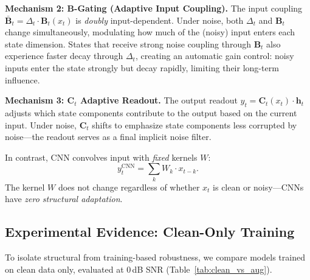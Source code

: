 \documentclass[journal]{IEEEtran}
\begin{document}
\smallskip\noindent\textbf{Mechanism 2: $\mathbf{B}$-Gating (Adaptive Input Coupling).}
The input coupling $\bar{\mathbf{B}}_t = \Delta_t \cdot \mathbf{B}_t(x_t)$ is \emph{doubly} input-dependent.
Under noise, both $\Delta_t$ and $\mathbf{B}_t$ change simultaneously, modulating how much of the (noisy) input enters each state dimension.
States that receive strong noise coupling through $\mathbf{B}_t$ also experience faster decay through $\Delta_t$, creating an automatic gain control: noisy inputs enter the state strongly but decay rapidly, limiting their long-term influence.

\smallskip\noindent\textbf{Mechanism 3: $\mathbf{C}_t$ Adaptive Readout.}
The output readout $y_t = \mathbf{C}_t(x_t) \cdot \mathbf{h}_t$ adjusts which state components contribute to the output based on the current input.
Under noise, $\mathbf{C}_t$ shifts to emphasize state components less corrupted by noise---the readout serves as a final implicit noise filter.

\smallskip
In contrast, CNN convolves input with \emph{fixed} kernels $W$:
\begin{equation}
y_t^{\text{CNN}} = \sum_k W_k \cdot x_{t-k}.
\label{eq:cnn_conv}
\end{equation}
The kernel $W$ does not change regardless of whether $x_t$ is clean or noisy---CNNs have \emph{zero structural adaptation}.

\subsection{Experimental Evidence: Clean-Only Training}
\label{sec:clean_evidence}

To isolate structural from training-based robustness, we compare models trained on clean data only, evaluated at 0\,dB SNR (Table~\ref{tab:clean_vs_aug}).
\end{document}
